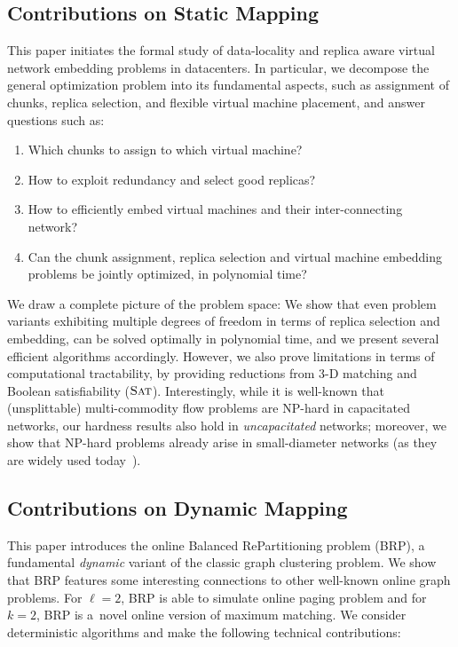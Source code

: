 \subsection{Contributions on Static Mapping}

This paper initiates the formal study of data-locality and replica aware virtual network embedding problems in datacenters.
In particular, we decompose the general optimization problem into its fundamental aspects, such as
assignment of chunks, replica selection, and flexible virtual machine
placement, and answer questions such as:
\begin{enumerate}
\item Which chunks to assign to which virtual machine?

\item How to exploit redundancy and select good replicas?

\item How to efficiently embed virtual machines and their inter-connecting network?

\item Can the chunk assignment, replica selection and virtual machine embedding problems be jointly optimized, in polynomial time?
\end{enumerate}

We draw a complete picture of the problem space: We show that
even problem variants exhibiting multiple degrees of freedom in terms of
replica selection and embedding,
can be solved optimally in polynomial time, and we present several efficient
algorithms accordingly. However, we also prove limitations in terms of
computational tractability, by providing reductions from 3-D matching
and Boolean satisfiability ($\textsc{Sat}$). Interestingly,
while it is well-known that (unsplittable) multi-commodity flow
problems are NP-hard in capacitated networks, our hardness results also hold in \emph{uncapacitated}
networks; moreover, we show that NP-hard problems already arise in small-diameter networks (as they are
widely used today~\cite{fattree}).

\subsection{Contributions on Dynamic Mapping}


This paper introduces the online Balanced RePartitioning problem (BRP),
a fundamental \emph{dynamic} variant of the classic graph clustering problem. 
We show that BRP features some interesting connections to other well-known
online graph problems. For $\ell=2$, BRP is able to simulate online paging problem
and for $k=2$, BRP is a~novel online version of maximum matching.
We consider deterministic algorithms and make the following technical
contributions:

